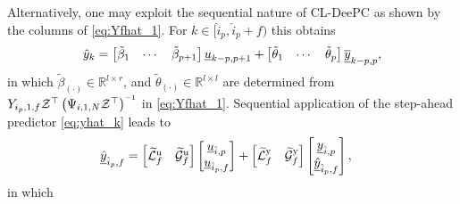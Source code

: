 Alternatively, one may exploit the sequential nature of \ac{CL-DeePC} as shown by the columns of \eqref{eq:Yfhat_1}. For $k\in[\hat{i}_p,\hat{i}_p+f)$ this obtains
\begin{align}\label{eq:yhat_k}
    \hat{y}_{k} = \begin{bmatrix} \tilde{\beta}_1 & \cdots & \tilde{\beta}_{p+1} \end{bmatrix} \datavec{u}{k-p,p+1} + \begin{bmatrix} \tilde{\theta}_1 & \cdots & \tilde{\theta}_{p} \end{bmatrix} \datavec{\overline{y}}{k-p,p},%
\end{align}
in which $\tilde{\beta}_{(\cdot)}\in\mathbb{R}^{l\times r}$, and $\tilde{\theta}_{(\cdot)}\in\mathbb{R}^{l\times l}$ are determined from $Y_{i_p,1,f}\mathcal{Z}^\top\left(\Psi_{i,1,N}\mathcal{Z}^\top\right)\inv$ in \eqref{eq:Yfhat_1}. Sequential application of the step-ahead predictor \eqref{eq:yhat_k} leads to
\begin{align}\label{eq:Sequential1}
    \underline{\hat{y}}_{\hat{i}_p,f} &=
    \begin{bmatrix}
        \widetilde{\mathcal{L}}^\mathrm{u}_f & \widetilde{\mathcal{G}}^\mathrm{u}_f 
    \end{bmatrix}    
    \begin{bmatrix}
        \underline{u}_{\hat{i},p}\\
        \underline{u}_{\hat{i}_p,f}
    \end{bmatrix}+
    \begin{bmatrix}
        \widetilde{\mathcal{L}}^\mathrm{y}_f & \widetilde{\mathcal{G}}^\mathrm{y}_f 
    \end{bmatrix}    
    \begin{bmatrix}
        \underline{y}_{\hat{i},p}\\
        \underline{\hat{y}}_{\hat{i}_p,f}
    \end{bmatrix},
\end{align}
in which
